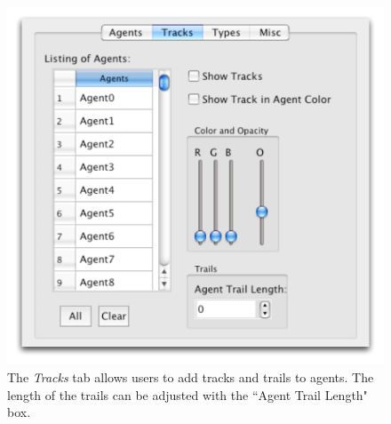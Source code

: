 \documentclass[conference]{IEEEtran}
\begin{document}
\begin{figure}
\centering
\includegraphics[scale=.5]{images/trackstab.pdf}
\caption{
The \textit{Tracks} tab allows users to add tracks and trails to agents. The length of the trails can be adjusted 
with the ``Agent Trail Length" box. }
\label{TracksTab}
\end{figure}
\end{document}
